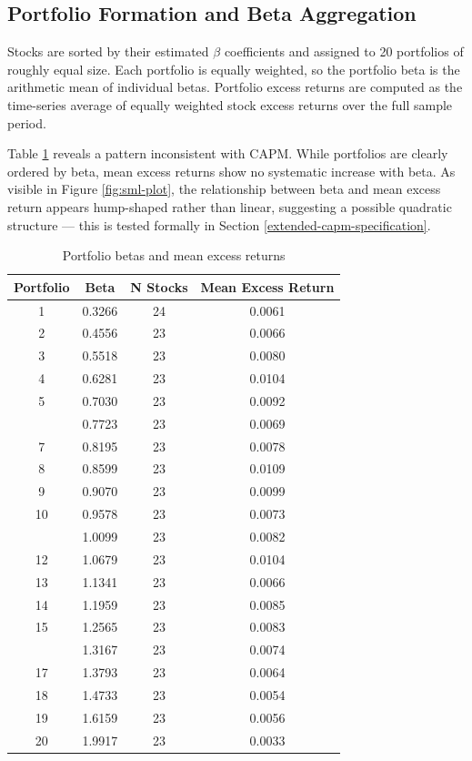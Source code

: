 \documentclass[
]{article}
\begin{document}
\subsection{Portfolio Formation and Beta Aggregation}\label{portfolio-formation-and-beta-aggregation}

Stocks are sorted by their estimated \(\beta\) coefficients and assigned to 20 portfolios of roughly equal size. Each portfolio is equally weighted, so the portfolio beta is the arithmetic mean of individual betas. Portfolio excess returns are computed as the time-series average of equally weighted stock excess returns over the full sample period.

Table \ref{tab:portfolio-table} reveals a pattern inconsistent with CAPM. While portfolios are clearly ordered by beta, mean excess returns show no systematic increase with beta. As visible in Figure \ref{fig:sml-plot}, the relationship between beta and mean excess return appears hump-shaped rather than linear, suggesting a possible quadratic structure --- this is tested formally in Section \ref{extended-capm-specification}.

\begin{table}

\caption{\label{tab:portfolio-table}Portfolio betas and mean excess returns}
\centering
\begin{tabular}[t]{cccc}
\toprule
Portfolio & Beta & N Stocks & Mean Excess Return\\
\midrule
1 & 0.3266 & 24 & 0.0061\\
2 & 0.4556 & 23 & 0.0066\\
3 & 0.5518 & 23 & 0.0080\\
4 & 0.6281 & 23 & 0.0104\\
5 & 0.7030 & 23 & 0.0092\\
\addlinespace
6 & 0.7723 & 23 & 0.0069\\
7 & 0.8195 & 23 & 0.0078\\
8 & 0.8599 & 23 & 0.0109\\
9 & 0.9070 & 23 & 0.0099\\
10 & 0.9578 & 23 & 0.0073\\
\addlinespace
11 & 1.0099 & 23 & 0.0082\\
12 & 1.0679 & 23 & 0.0104\\
13 & 1.1341 & 23 & 0.0066\\
14 & 1.1959 & 23 & 0.0085\\
15 & 1.2565 & 23 & 0.0083\\
\addlinespace
16 & 1.3167 & 23 & 0.0074\\
17 & 1.3793 & 23 & 0.0064\\
18 & 1.4733 & 23 & 0.0054\\
19 & 1.6159 & 23 & 0.0056\\
20 & 1.9917 & 23 & 0.0033\\
\bottomrule
\end{tabular}
\end{table}
\end{document}
